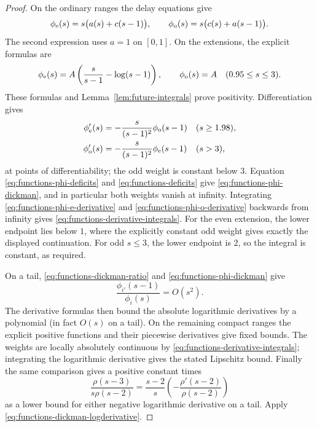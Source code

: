 \begin{proof}
On the ordinary ranges the delay equations give
\begin{equation}\label{eq:functions-phi-deficits}
 \phi_\mathrm e(s)=s\bigl(a(s)+c(s-1)\bigr),\qquad
 \phi_\mathrm o(s)=s\bigl(c(s)+a(s-1)\bigr).
\end{equation}
The second expression uses \(a=1\) on \([0,1]\).
On the extensions, the explicit formulas are
\[
 \phi_\mathrm e(s)=A\left(\frac{s}{s-1}-\log(s-1)\right),\qquad
 \phi_\mathrm o(s)=A\quad(0.95\le s\le3).
\]
These formulas and Lemma~\ref{lem:future-integrals} prove positivity.
Differentiation gives
\begin{align}
 \phi_\mathrm e'(s)&=-\frac{s}{(s-1)^2}\phi_\mathrm o(s-1)
       &&(s\ge1.98),\label{eq:functions-phi-e-derivative}\\
 \phi_\mathrm o'(s)&=-\frac{s}{(s-1)^2}\phi_\mathrm e(s-1)
       &&(s>3),\label{eq:functions-phi-o-derivative}
\end{align}
at points of differentiability; the odd weight is constant below \(3\).
Equation \eqref{eq:functions-phi-deficits} and
\eqref{eq:functions-deficits} give \eqref{eq:functions-phi-dickman},
and in particular both weights vanish at infinity.
Integrating \eqref{eq:functions-phi-e-derivative} and
\eqref{eq:functions-phi-o-derivative} backwards from infinity gives
\eqref{eq:functions-derivative-integrals}.
For the even extension, the lower endpoint lies below \(1\), where
the explicitly constant odd weight gives exactly the displayed
continuation.  For odd \(s\le3\), the lower endpoint is \(2\), so the
integral is constant, as required.

On a tail, \eqref{eq:functions-dickman-ratio} and
\eqref{eq:functions-phi-dickman} give
\[
 \frac{\phi_{i'}(s-1)}{\phi_i(s)}=O(s^2).
\]
The derivative formulas then bound the absolute logarithmic
derivatives by a polynomial (in fact \(O(s)\) on a tail).
On the remaining compact ranges the explicit positive functions
and their piecewise derivatives give fixed bounds.
The weights are locally absolutely continuous by
\eqref{eq:functions-derivative-integrals}; integrating the
logarithmic derivative gives the stated Lipschitz bound.
Finally the same comparison gives a positive constant times
\[
 \frac{\rho(s-3)}{s\rho(s-2)}
 =\frac{s-2}{s}\left(-\frac{\rho'(s-2)}{\rho(s-2)}\right)
\]
as a lower bound for either negative logarithmic derivative on a
tail.  Apply \eqref{eq:functions-dickman-logderivative}.
\end{proof}

